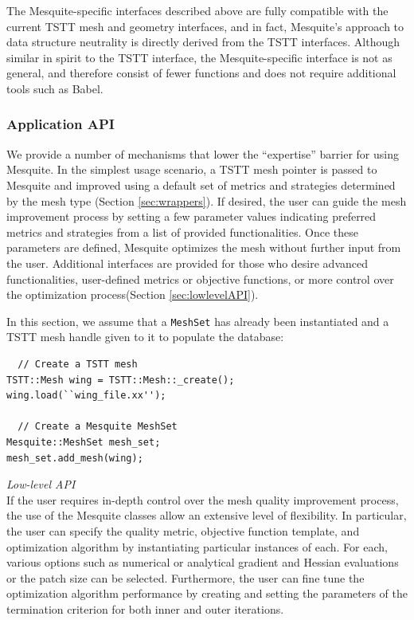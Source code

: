 \documentclass[psfig]{article}
\begin{document}
The Mesquite-specific interfaces described above are fully compatible
with the current TSTT mesh and geometry interfaces, and in fact,
Mesquite's approach to data structure neutrality is directly derived
from the TSTT interfaces.  Although similar in spirit to the TSTT
interface, the Mesquite-specific interface is not as general, and 
therefore consist of fewer
functions and does not require additional tools such as Babel.

\subsubsection{Application API}

We provide a number of mechanisms that lower the ``expertise'' barrier
for using Mesquite.  In the simplest usage scenario, a TSTT mesh
pointer is passed to Mesquite and improved using a default set of
metrics and strategies determined by the mesh type (Section
\ref{sec:wrappers}).  If desired, the user can guide the mesh
improvement process by setting a few parameter values indicating
preferred metrics and strategies from a list of provided
functionalities.  Once these parameters are defined, Mesquite
optimizes the mesh without further input from the user.  Additional
interfaces are provided for those who desire advanced functionalities,
user-defined metrics or objective functions, or more control over the
optimization process(Section \ref{sec:lowlevelAPI}).

In this section, we 
assume that a \texttt{MeshSet} has already been instantiated 
and a TSTT mesh handle given to it to populate the database:
\begin{verbatim}
  // Create a TSTT mesh
TSTT::Mesh wing = TSTT::Mesh::_create();
wing.load(``wing_file.xx'');

  // Create a Mesquite MeshSet
Mesquite::MeshSet mesh_set;
mesh_set.add_mesh(wing);
\end{verbatim}

{\it Low-level API} \\

If the user requires in-depth control over the mesh quality improvement
process, the use of the Mesquite classes allow an extensive
level of flexibility.   In particular, the user can specify the quality
metric, objective function template, and optimization algorithm by
instantiating particular instances of each.  For each, various options
such as numerical or analytical gradient and Hessian evaluations or
the patch size can be selected.  Furthermore, the user can fine tune
the optimization algorithm performance by creating and setting the parameters 
of the termination criterion for both inner and outer iterations.
\end{document}
